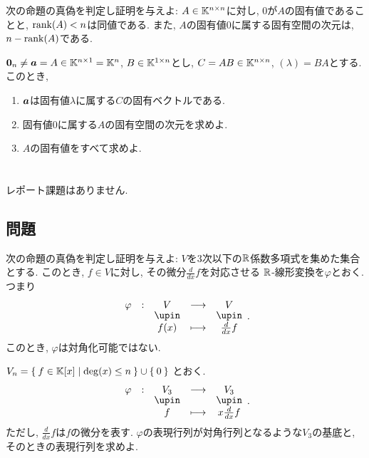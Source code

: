 \begin{quiz}
  次の命題の真偽を判定し証明を与えよ:
  $A\in\mathbb{K}^{n\times n}$に対し,
  $0$が$A$の固有値であることと,
  $\operatorname{rank}(A)<n$は同値である.
  また,
  $A$の固有値$0$に属する固有空間の次元は,
  $n-\operatorname{rank}(A)$である.
\end{quiz}

\begin{quiz}
  $\boldsymbol{0}_n\neq \boldsymbol{a}=A\in\mathbb{K}^{n\times 1}=\mathbb{K}^n$,
  $B\in\mathbb{K}^{1\times n}$とし,
  $C=AB\in\mathbb{K}^{n\times n}$, $(\lambda)=BA$とする.
  このとき,
  \begin{enumerate}
  \item $\boldsymbol{a}$は固有値$\lambda$に属する$C$の固有ベクトルである.
  \item 固有値$0$に属する$A$の固有空間の次元を求めよ.
  \item $A$の固有値をすべて求めよ.
  \end{enumerate}
\end{quiz}



\section{}
レポート課題はありません.

\subsection{問題}
\begin{quiz}
  次の命題の真偽を判定し証明を与えよ:
  $V$を$3$次以下の$\mathbb{R}$係数多項式を集めた集合とする.
  このとき,
  $f\in V$に対し, その微分$\frac{d}{dx}f$を対応させる
  $\mathbb{R}$-線形変換を$\varphi$とおく. つまり
  \begin{align*}
    \shazo{\varphi}{V}{V}
    {f(x)}{\frac{d}{dx}f}.
  \end{align*}
  このとき,
  $\varphi$は対角化可能ではない.
\end{quiz}

\begin{quiz}
  $V_n=\Set{f\in \mathbb{K}[x] |\deg(x) \leq n}\cup\Set{0}$
  とおく.
  \begin{align*}
    \shazo{\varphi}{V_3}{V_3}
    {f}{x\frac{d}{dx}f}.
  \end{align*}
  ただし, $\frac{d}{dx}f$は$f$の微分を表す.
  $\varphi$の表現行列が対角行列となるような$V_3$の基底と,
  そのときの表現行列を求めよ.
\end{quiz}

